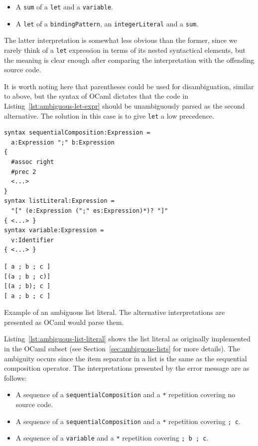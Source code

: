 \documentclass{kththesis}
\begin{document}
\begin{itemize}
  \item A \texttt{sum} of a \texttt{let} and a \texttt{variable}.
  \item A \texttt{let} of a \texttt{bindingPattern}, an \texttt{integerLiteral} and a \texttt{sum}.
\end{itemize}

The latter interpretation is somewhat less obvious than the former, since we rarely think of a \texttt{let} expression in terms of its nested syntactical elements, but the meaning is clear enough after comparing the interpretation with the offending source code.

It is worth noting here that parentheses could be used for disambiguation, similar to above, but the syntax of OCaml dictates that the code in Listing~\ref{lst:ambiguous-let-expr} should be unambiguously parsed as the second alternative. The solution in this case is to give \texttt{let} a low precedence.

\begin{listing}[t]
\begin{verbatim}
syntax sequentialComposition:Expression =
  a:Expression ";" b:Expression
{
  #assoc right
  #prec 2
  <...>
}
syntax listLiteral:Expression =
  "[" (e:Expression (";" es:Expression)*)? "]"
{ <...> }
syntax variable:Expression =
  v:Identifier
{ <...> }
\end{verbatim}
\begin{verbatim}
[ a ; b ; c ]
[(a ; b ; c)]
[(a ; b); c ]
[ a ; b ; c ]
\end{verbatim}
\caption{Example of an ambiguous list literal. The alternative interpretations are presented as OCaml would parse them.}
\label{lst:ambiguous-list-literal}
\end{listing}

Listing~\ref{lst:ambiguous-list-literal} shows the list literal as originally implemented in the OCaml subset (see Section~\ref{sec:ambiguous-lists} for more details). The ambiguity occurs since the item separator in a list is the same as the sequential composition operator. The interpretations presented by the error message are as follows:

\begin{itemize}
  \item A sequence of a \texttt{sequentialComposition} and a \texttt{*} repetition covering no source code.
  \item A sequence of a \texttt{sequentialComposition} and a \texttt{*} repetition covering \texttt{; c}.
  \item A sequence of a \texttt{variable} and a \texttt{*} repetition covering \texttt{; b ; c}.
\end{itemize}
\end{document}
